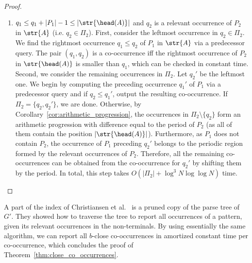 \begin{proof}
\begin{enumerate}
    \item $q_1 \le q_1+|P_1|-1 \le |\str{\head(A)}|$ and $q_2$ is a relevant occurrence of $P_2$ in $\str{A}$ (i.e. $q_2 \in \Pi_2$). First, consider the leftmost occurrence in $q_2 \in \Pi_2$. We find the rightmost occurrence $q_1 \le q_2$  of $P_1$ in $\str{A}$ via a predecessor query. The pair $(q_1,q_2)$  is a co-occurrence iff the rightmost occurrence of $P_2$ in $\str{\head(A)}$ is smaller than $q_1$, which can be checked in constant time. Second, we consider the remaining occurrences in $\Pi_2$. Let $q_2'$ be the leftmost one. We begin by computing the preceding occurrence $q_1'$ of $P_1$ via a predecessor query and if $q_2 \le q_1'$, output the resulting co-occurrence. If $\Pi_2 = \{q_2, q_2'\}$, we are done. Otherwise, by Corollary~\ref{cor:arithmetic_progression}, the occurrences in $\Pi_2 \setminus \{q_2\}$ form an arithmetic progression with difference equal to the period of $P_2$ (as all of them contain the position $|\str{\head(A)}|$). Furthermore, as $P_1$ does not contain $P_2$, the occurrence of $P_1$ preceding $q_2'$ belongs to the periodic region formed by the relevant occurrences of $P_2$. Therefore, all the remaining co-occurrences can be obtained from the co-occurrence for $q_2'$ by shifting them by the period. In total, this step takes $O(|\Pi_2| + \log^{3} N\log\log N)$ time.
    \end{enumerate}
\end{proof}


A part of the index of Christiansen et al.~\cite{talg/ChristiansenEKN21} is a pruned copy of the parse tree of $G'$. They showed how to traverse the tree to report all occurrences of a pattern, given its relevant occurrences in the non-terminals. By using essentially the same algorithm, we can report all $b$-close co-occurrences in amortized constant time per co-occurrence, which concludes the proof of Theorem~\ref{thm:close_co_occurrences}. 

